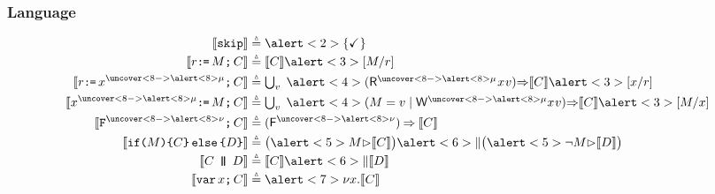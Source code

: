 \documentclass[t,aspectratio=169]{beamer} %
\begin{document}
\begin{frame}
  \frametitle{Language}
  \begin{gather*}
    \begin{aligned}
      \sem[\aThrd]{\SKIP} & \eqdef
      \alert<2>{\{ \DSTOP \}}
      \\
      \sem[\aThrd]{\aReg\GETS\aExp\SEMI \aCmd} & \eqdef
      \sem[\aThrd]{\aCmd}\alert<3>{[\aExp/\aReg]}
      \\ 
      \sem{\aReg\GETS\aLoc^{\uncover<8->{\alert<8>{\amode}}}\SEMI \aCmd} & \eqdef \textstyle\bigcup_\aVal\;
      \alert<4>{(\DR[\uncover<8->{\alert<8>{\amode}}]\aLoc\aVal)\prefix} \sem{\aCmd} \alert<3>{[\aLoc/\aReg]}
      \\
      \sem{\aLoc^{\uncover<8->{\alert<8>{\amode}}}\GETS\aExp\SEMI \aCmd} & \eqdef
      \textstyle\bigcup_\aVal\; \alert<4>{(\aExp=\aVal \mid \DW[\uncover<8->{\alert<8>{\amode}}]\aLoc\aVal)\prefix} \sem{\aCmd}\alert<3>{[\aExp/\aLoc]}
      \\
      \sem{\FENCE^{\uncover<8->{\alert<8>{\fmode}}}\SEMI \aCmd} & \eqdef
      (\DFS{\uncover<8->{\alert<8>{\fmode}}}) \prefix \sem{\aCmd}
      \\
      \sem[\aThrd]{\IF{\aExp} \THEN \aCmd \ELSE \bCmd \FI} & \eqdef
      \bigl(\alert<5>{\aExp \guard} \sem[\aThrd]{\aCmd}\bigr) \alert<6>{\parallel} \bigl(\alert<5>{\lnot\aExp \guard} \sem[\aThrd]{\bCmd}\bigr) 
      \\
      \sem[\aThrd]{\aCmd \PAR[\bThrd][\bThrd'] \bCmd} & \eqdef
      \sem[\bThrd]{\aCmd} \alert<6>{\parallel} \sem[\bThrd']{\bCmd} 
      \\
      \sem[\aThrd]{\VAR\aLoc\SEMI \aCmd} & \eqdef
      \alert<7>{\nu \aLoc \DOT} \sem[\aThrd]{\aCmd}  
    \end{aligned}
  \end{gather*}
\end{frame}
\end{document}
